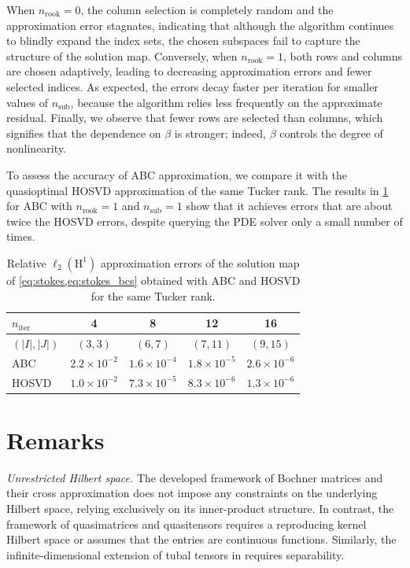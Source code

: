 \documentclass[onefignum,onetabnum]{siamart250211}
\newcommand{\Hilb}{\mathrm{H}}
\newcommand{\Index}[1]{{#1}}
\begin{document}
When $n_{\mathrm{rook}} = 0$, the column selection is completely random and the approximation error stagnates, indicating that although the algorithm continues to blindly expand the index sets, the chosen subspaces fail to capture the structure of the solution map.
Conversely, when $n_{\mathrm{rook}} = 1$, both rows and columns are chosen adaptively, leading to decreasing approximation errors and fewer selected indices.
As expected, the errors decay faster per iteration for smaller values of $n_{\mathrm{sub}}$, because the algorithm relies less frequently on the approximate residual.
Finally, we observe that fewer rows are selected than columns, which signifies that the dependence on $\beta$ is stronger; indeed, $\beta$ controls the degree of nonlinearity.

To assess the accuracy of ABC approximation, we compare it with the quasioptimal HOSVD approximation of the same Tucker rank.
The results in \cref{tab:fenics_errors} for ABC with $n_{\mathrm{rook}} = 1$ and $n_{\mathrm{sub}} = 1$ show that it achieves errors that are about twice the HOSVD errors, despite querying the PDE solver only a small number of times.

\begin{table}[h]
    \centering
    \caption{Relative $\ell_2(\Hilb^1)$ approximation errors of the solution map of \cref{eq:stokes,eq:stokes_bcs} obtained with ABC and HOSVD for the same Tucker rank.}
    \label{tab:fenics_errors}
    \begin{tabular*}{\textwidth}{@{\extracolsep\fill}lcccc@{}}
        \toprule
        $n_{\mathrm{iter}}$ & 4 & 8 & 12 & 16 \\
        \midrule
        $(|\Index{I}|, |\Index{J}|)$ & $(3,3)$ & $(6,7)$ & $(7,11)$ & $(9,15)$ \\
        ABC & $2.2 \times 10^{-2}$ & $1.6 \times 10^{-4}$ & $1.8 \times 10^{-5}$ & $2.6 \times 10^{-6}$ \\
        HOSVD & $1.0 \times 10^{-2}$ & $7.3 \times 10^{-5}$ & $8.3 \times 10^{-6}$ & $1.3 \times 10^{-6}$ \\
        \bottomrule
    \end{tabular*}  
\end{table}
\section{Remarks}
\label{sec:remarks}

\emph{Unrestricted Hilbert space.}
The developed framework of Bochner matrices and their cross approximation does not impose any constraints on the underlying Hilbert space, relying exclusively on its inner-product structure.
In contrast, the framework of quasimatrices \cite{townsend2015continuous,shustin2022semi} and quasitensors \cite{larsen2024tensor,han2024guaranteed} requires a reproducing kernel Hilbert space or assumes that the entries are continuous functions.
Similarly, the infinite-dimensional extension of tubal tensors in \cite{mor2025quasitubal} requires separability.
\end{document}
